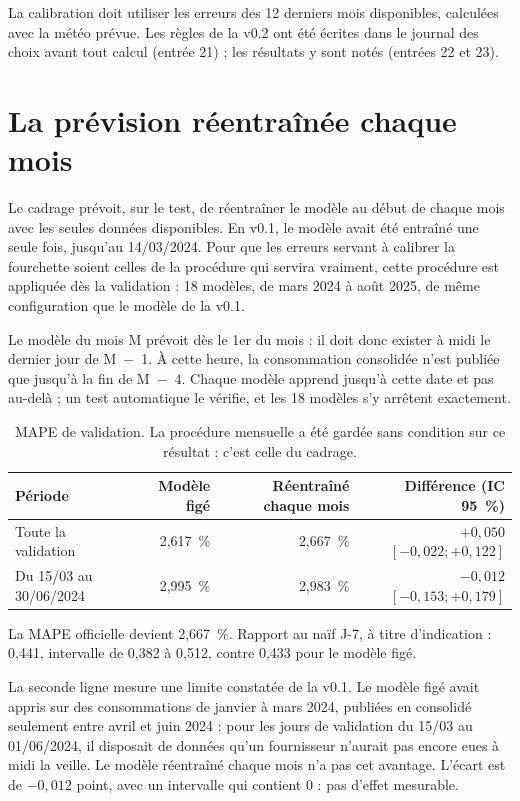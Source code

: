 \documentclass[11pt,a4paper]{article}
\begin{document}
La calibration doit utiliser les erreurs des 12 derniers mois disponibles, calculées avec la météo prévue. Les règles de la v0.2 ont été écrites dans le journal des choix avant tout calcul (entrée 21) ; les résultats y sont notés (entrées 22 et 23).

\section{La prévision réentraînée chaque mois}

Le cadrage prévoit, sur le test, de réentraîner le modèle au début de chaque mois avec les seules données disponibles. En v0.1, le modèle avait été entraîné une seule fois, jusqu'au 14/03/2024. Pour que les erreurs servant à calibrer la fourchette soient celles de la procédure qui servira vraiment, cette procédure est appliquée dès la validation : 18 modèles, de mars 2024 à août 2025, de même configuration que le modèle de la v0.1.

Le modèle du mois M prévoit dès le 1er du mois : il doit donc exister à midi le dernier jour de M~$-$~1. À cette heure, la consommation consolidée n'est publiée que jusqu'à la fin de M~$-$~4. Chaque modèle apprend jusqu'à cette date et pas au-delà ; un test automatique le vérifie, et les 18 modèles s'y arrêtent exactement.

\begin{table}[H]
\small
\begin{tabularx}{\linewidth}{Yrrr}
\toprule
\textbf{Période} & \textbf{Modèle figé} & \textbf{Réentraîné chaque mois} & \textbf{Différence (IC 95~\%)} \\
\midrule
Toute la validation & 2,617~\% & 2,667~\% & $+0{,}050$ $[-0{,}022 ; +0{,}122]$ \\
Du 15/03 au 30/06/2024 & 2,995~\% & 2,983~\% & $-0{,}012$ $[-0{,}153 ; +0{,}179]$ \\
\bottomrule
\end{tabularx}
\caption{MAPE de validation. La procédure mensuelle a été gardée sans condition sur ce résultat : c'est celle du cadrage.}
\end{table}

La MAPE officielle devient 2,667~\%. Rapport au naïf J-7, à titre d'indication : 0,441, intervalle de 0,382 à 0,512, contre 0,433 pour le modèle figé.

La seconde ligne mesure une limite constatée de la v0.1. Le modèle figé avait appris sur des consommations de janvier à mars 2024, publiées en consolidé seulement entre avril et juin 2024 : pour les jours de validation du 15/03 au 01/06/2024, il disposait de données qu'un fournisseur n'aurait pas encore eues à midi la veille. Le modèle réentraîné chaque mois n'a pas cet avantage. L'écart est de $-0{,}012$ point, avec un intervalle qui contient 0 : pas d'effet mesurable.
\end{document}
